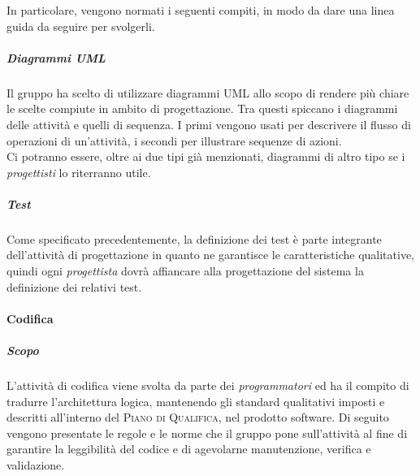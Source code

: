 In particolare, vengono normati i seguenti compiti, in modo da dare una linea guida da seguire per svolgerli.


\subparagraph{Diagrammi UML}

Il gruppo ha scelto di utilizzare diagrammi UML allo scopo di rendere più chiare le scelte compiute in ambito di
progettazione. Tra questi spiccano i diagrammi delle attività e quelli di sequenza. I primi vengono
usati per descrivere il flusso di operazioni di un'attività, i secondi per illustrare sequenze di azioni.\\
Ci potranno essere, oltre ai due tipi già menzionati, diagrammi di altro tipo se i \emph{progettisti} lo riterranno
utile.

\subparagraph{Test}

Come specificato precedentemente, la definizione dei test è parte integrante dell'attività di progettazione in quanto ne garantisce le caratteristiche qualitative, quindi ogni \emph{progettista} dovrà affiancare alla progettazione del sistema la definizione dei relativi test.


\paragraph{Codifica}
\label{ssub:codifica}
\subparagraph{Scopo}
\label{par:codifica:scopo}
L'attività di codifica viene svolta da parte dei \emph{programmatori} ed ha il compito di tradurre l'architettura logica, mantenendo gli
standard qualitativi imposti e descritti all'interno del \textsc{Piano di Qualifica}, nel prodotto software. Di seguito vengono presentate
le regole e le norme che il gruppo pone sull'attività al fine di garantire la leggibilità del codice e di agevolarne manutenzione,
verifica e validazione.

